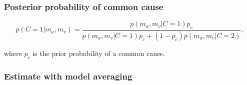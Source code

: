 \documentclass[9pt,lineno,doublespacing]{elife}
\begin{document}





\subsubsection{Posterior probability of common cause}

\begin{equation}
p(C=1 | m_a, m_v) = \frac{p(m_a, m_v | C=1) p_c}{p(m_a, m_v | C=1) p_c + (1 - p_c) p(m_a, m_v | C=2)},
\end{equation}

where $p_c$ is the prior probability of a common cause.

\subsubsection{Estimate with model averaging}
\end{document}
